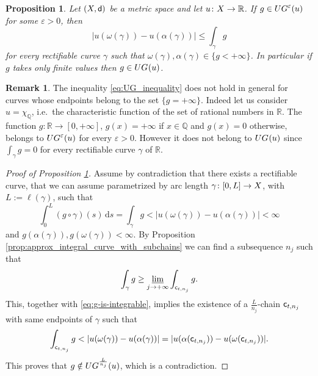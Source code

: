\documentclass[12pt]{amsart}
\newcommand{\N}{\mathbb{N}}
\newcommand{\Q}{\mathbb{Q}}
\newcommand{\R}{\mathbb{R}}
\newcommand{\sfd}{{\sf d}}
\renewcommand{\d}{{\mathrm d}}
\newcommand{\limi}{\varliminf}
\newcommand{\X}{{\rm X}}
\newtheorem{proposition}[theorem]{Proposition}
\theoremstyle{definition}
\newtheorem{remark}[theorem]{Remark}
\newcommand{\sfc}{{\sf c}}
\newcommand{\Chain}[1]{\mathscr{C}^{#1}}
\newcommand{\UG}[1]{{\rm UG}^{#1}}
\begin{document}
%
\begin{proposition}
\label{prop:UGeta_subset_UG}
    Let $(\X,\sfd)$ be a metric space and let $u\colon \X \to \R$. If $g\in \UG{\varepsilon}(u)$ for some $\varepsilon >0$, then 
    \begin{equation}
    \label{eq:UG_inequality}
        \vert u(\omega(\gamma)) - u(\alpha(\gamma)) \vert \le \int_\gamma g
    \end{equation}
    for every rectifiable curve $\gamma$ such that $\omega(\gamma), \alpha(\gamma) \in \{g < +\infty \}$. In particular if $g$ takes only finite values then $g \in \UG{}(u)$.
\end{proposition}
%
\begin{remark}
The inequality \eqref{eq:UG_inequality} does not hold in general for curves whose endpoints belong to the set $\{g = +\infty\}$.
Indeed let us consider $u=\chi_\Q$, i.e.\ the characteristic function of the set of rational numbers in $\R$. The function $g\colon \R \to [0,+\infty]$, $g(x) = +\infty$ if $x\in \Q$ and $g(x) = 0$ otherwise, belongs to $\UG{\varepsilon}(u)$ for every $\varepsilon > 0$. However it does not belong to $\UG{}(u)$ since $\int_\gamma g = 0$ for every rectifiable curve $\gamma$ of $\R$.
\end{remark}
%
\begin{proof}[Proof of Proposition \ref{prop:UGeta_subset_UG}] 

Assume by contradiction that there exists a rectifiable curve, that we can assume parametrized by arc length $\gamma\colon [0,L] \to \X$, with $L:=\ell(\gamma)$, such that 
\begin{equation}
\label{eq:g-is-integrable}
    \int_0^L (g\circ \gamma)(s)\,\d s = \int_\gamma g < |u(\omega(\gamma))-u(\alpha(\gamma))| < \infty
\end{equation}
and $g(\alpha(\gamma)), g(\omega(\gamma)) < \infty$.
By Proposition \ref{prop:approx_integral_curve_with_subchains} we can find a subsequence $n_j$ such that 
$$\int_\gamma g \ge \limi_{j\to +\infty} \int_{\sfc_{t,n_j}} g.$$
This, together with \eqref{eq:g-is-integrable}, implies the existence of a $\frac{L}{n_j}$-chain $\sfc_{t,n_j}$ with same endpoints of $\gamma$ such that 
$$\int_{\sfc_{t,n_j}} g < |u(\omega(\gamma))-u(\alpha(\gamma))| = \vert u(\alpha(\sfc_{t,n_j})) - u(\omega(\sfc_{t,n_j}))\vert.$$
%
This proves that $g \notin \UG{\frac{L}{n_j}}(u)$, which is a contradiction.
\end{proof}
\end{document}
